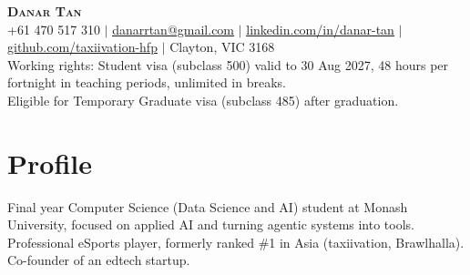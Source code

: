 \documentclass[letterpaper,11pt]{article}
\begin{document}
\begin{center}
    \textbf{\Huge \scshape Danar Tan} \\ \vspace{1pt}
    \small +61 470 517 310 $|$ \href{mailto:danarrtan@gmail.com}{\underline{danarrtan@gmail.com}} $|$
    \href{https://linkedin.com/in/danar-tan}{\underline{linkedin.com/in/danar-tan}} $|$ \href{https://github.com/taxiivation-hfp}{\underline{github.com/taxiivation-hfp}} $|$ Clayton, VIC 3168 \\ \vspace{2pt}
    \footnotesize Working rights: Student visa (subclass 500) valid to 30 Aug 2027, 48 hours per fortnight in teaching periods, unlimited in breaks. \\
    \footnotesize Eligible for Temporary Graduate visa (subclass 485) after graduation. \\
\end{center}

\section{Profile}
  \small{Final year Computer Science (Data Science and AI) student at Monash University, focused on applied AI and turning agentic systems into tools. Professional eSports player, formerly ranked \#1 in Asia (taxiivation, Brawlhalla). Co-founder of an edtech startup.}
  \vspace{-4pt}

\end{document}
